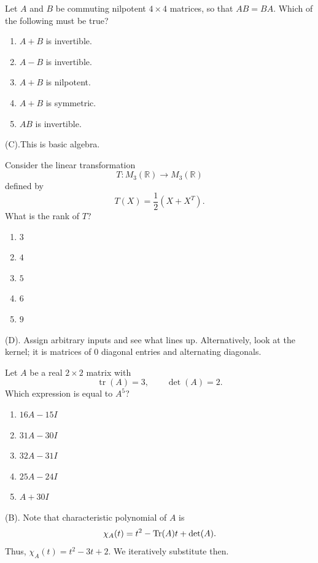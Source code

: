 \begin{exercise}
Let $A$ and $B$ be commuting nilpotent $4\times4$ matrices, so that $AB=BA$.
Which of the following must be true?
\begin{enumerate}[label=(\Alph*)]
    \item $A+B$ is invertible.
    \item $A-B$ is invertible.
    \item $A+B$ is nilpotent.
    \item $A+B$ is symmetric.
    \item $AB$ is invertible.
\end{enumerate}
\end{exercise}
\begin{solution}
(C).This is basic algebra.
\end{solution}

\begin{exercise}
Consider the linear transformation
\[
T:M_3(\mathbb R)\to M_3(\mathbb R)
\]
defined by
\[
T(X)=\frac12(X+X^T).
\]
What is the rank of $T$?
\begin{enumerate}[label=(\Alph*)]
    \item $3$
    \item $4$
    \item $5$
    \item $6$
    \item $9$
\end{enumerate}
\end{exercise}
\begin{solution}
(D). Assign arbitrary inputs and see what lines up. 
Alternatively, look at the kernel; it is matrices of $0$ 
diagonal entries and alternating diagonals.
\end{solution}

\begin{exercise}
Let $A$ be a real $2\times2$ matrix with
\[
\operatorname{tr}(A)=3,\qquad \det(A)=2.
\]
Which expression is equal to $A^5$?
\begin{enumerate}[label=(\Alph*)]
    \item $16A-15I$
    \item $31A-30I$
    \item $32A-31I$
    \item $25A-24I$
    \item $A+30I$
\end{enumerate}
\end{exercise}
\begin{solution}
(B). Note that characteristic polynomial of $A$ is 
\[
\chi_A(t)  = t^2 - \text{Tr}(A)t + \det (A).
\]
Thus, $\chi_A(t) = t^2 - 3t + 2$. We iteratively substitute then.
\end{solution}

